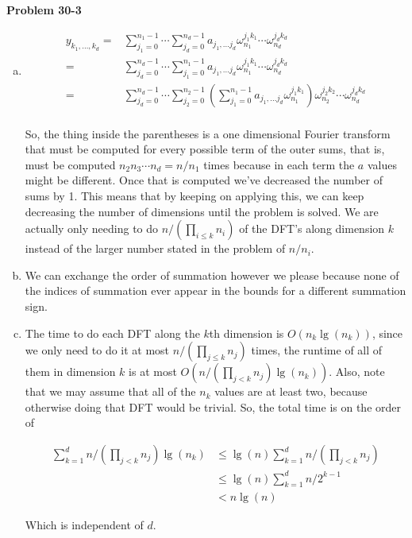 \documentclass{article}
\begin{document}
\noindent\textbf{Problem 30-3}\\
\begin{enumerate}[a.]
\item
\begin{align*}
y_{k_1,\ldots,k_d} =& \sum_{j_1=0}^{n_1-1} \cdots \sum_{j_d=0}^{n_d-1} a_{j_1,\ldots j_d} \omega_{n_1}^{j_1k_1}\cdots \omega_{n_d}^{j_d k_d}\\
=&\sum_{j_d=0}^{n_d-1} \cdots \sum_{j_1=0}^{n_1-1} a_{j_1,\ldots j_d} \omega_{n_1}^{j_1k_1}\cdots \omega_{n_d}^{j_d k_d}\\
=&\sum_{j_d=0}^{n_d-1} \cdots \sum_{j_2=0}^{n_2-1}\left(\sum_{j_1=0}^{n_1-1} a_{j_1,\ldots j_d} \omega_{n_1}^{j_1k_1}\right)\omega_{n_2}^{j_2k_2}\cdots \omega_{n_d}^{j_d k_d}\\
\end{align*}

So, the thing inside the parentheses is a one dimensional Fourier transform that must be computed for every possible term of the outer sums, that is, must be computed $n_2 n_3 \cdots n_d = n/n_1$ times because in each term the $a$ values might be different. Once that is computed we've decreased the number of sums by 1. This means that by keeping on applying this, we can keep decreasing the number of dimensions until the problem is solved. We are actually only needing to do $n/(\prod_{i\le k} n_i)$ of the DFT's along dimension $k$ instead of the larger number stated in the problem of $n/n_i$.
\item
We can exchange the order of summation however we please because none of the indices of summation ever appear in the bounds for a different summation sign.
\item
The time to do each DFT along the $k$th dimension is $O(n_k\lg(n_k))$, since we only need to do it at most $n/(\prod_{j\le k} n_j)$ times, the runtime of all of them in dimension $k$ is at most $O(n/(\prod_{j<k} n_j)\lg(n_k))$. Also, note that we may assume that all of the $n_k$ values are at least two, because otherwise doing that DFT would be trivial. So, the total time is on the order of

\begin{align*}
\sum_{k=1}^d n/\left(\prod_{j<k} n_j\right) \lg(n_k) &\le \lg(n) \sum_{k=1}^d n/\left(\prod_{j<k} n_j\right) \\
&\le\lg(n) \sum_{k=1}^d n/2^{k-1}\\
&< n\lg(n)
\end{align*}

Which is independent of $d$.

\end{enumerate}
\end{document}
